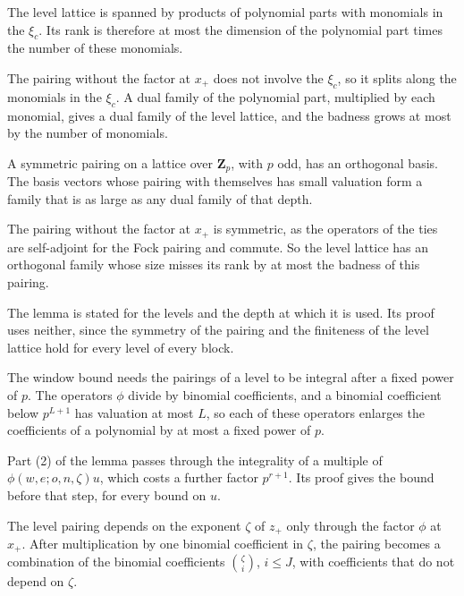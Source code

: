 The level lattice is spanned by products of polynomial parts with monomials in the $\xi_c$. Its rank is
therefore at most the dimension of the polynomial part times the number of these monomials.

The pairing without the factor at $x_+$ does not involve the $\xi_c$, so it splits along the monomials in the
$\xi_c$. A dual family of the polynomial part, multiplied by each monomial, gives a dual family of the level
lattice, and the badness grows at most by the number of monomials.

A symmetric pairing on a lattice over $\mathbf Z_p$, with $p$ odd, has an orthogonal basis. The basis vectors whose
pairing with themselves has small valuation form a family that is as large as any dual family of that depth.

The pairing without the factor at $x_+$ is symmetric, as the operators of the ties are self-adjoint for the
Fock pairing and commute. So the level lattice has an orthogonal family whose size misses its rank by at
most the badness of this pairing.

The lemma is stated for the levels and the depth at which it is used. Its proof uses neither, since the
symmetry of the pairing and the finiteness of the level lattice hold for every level of every block.

The window bound needs the pairings of a level to be integral after a fixed power of $p$. The operators $\phi$
divide by binomial coefficients, and a binomial coefficient below $p^{L+1}$ has valuation at most $L$, so each
of these operators enlarges the coefficients of a polynomial by at most a fixed power of $p$.

Part (2) of the lemma passes through the integrality of a multiple of $\phi(w,e;o,n,\zeta)u$, which costs a
further factor $p^{r+1}$. Its proof gives the bound before that step, for every bound on $u$.

The level pairing depends on the exponent $\zeta$ of $z_+$ only through the factor $\phi$ at $x_+$. After
multiplication by one binomial coefficient in $\zeta$, the pairing becomes a combination of the binomial
coefficients $\binom\zeta i$, $i\leq J$, with coefficients that do not depend on $\zeta$.

